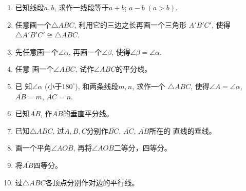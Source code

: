 \begin{solution}
    
\end{solution}

\begin{example}
	
\end{example}


\begin{solution}
    
\end{solution}


\begin{example}
    
\end{example}

\begin{solution}
    
\end{solution}


\begin{example}
    
\end{example}
\begin{solution}
    
\end{solution}


\begin{example}
    
\end{example}


\begin{solution}
    
\end{solution}

\begin{ex}
\begin{enumerate}
	\item 已知线段$a,b$, 求作一线段等于$a+b$; $a-b\; (a>b)$.
	\item 任意画一个$\triangle ABC$, 利用它的三边之长再画一个三角形
$A'B'C'$, 使得$\triangle A'B'C'\cong \triangle ABC$.
	\item 先任意画一个$\angle \alpha$, 再画一个$\angle \beta$, 使得$\angle \beta=\angle\alpha$.
	\item 任意
	画一个$\angle ABC$, 试作$\angle ABC$的平分线。
	\item 已
	知$\angle \alpha$ (小于$180^{\circ}$), 和两条线段$m,n$, 求作一个
	$\triangle 
	ABC$, 使得$\angle A=\angle \alpha$, $\overline{AB}=m$, $\overline{AC}=n$.
	\item 已知$\overline{AB}$, 作$\overline{AB}$的垂直平分线。
	\item 已知$\triangle ABC$, 过$A,B,C$分别作$\overline{BC}$, $\overline{AC}$, $\overline{AB}$所在的
	直线的垂线。
	\item 画一个平角$\angle AOB$, 再将$\angle AOB$二等分，四等分。
	\item 将$\overline{AB}$四等分。
	\item 过$\triangle ABC$各顶点分别作对边的平行线。
\end{enumerate}
\end{ex}

